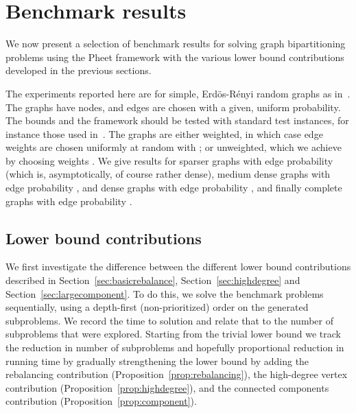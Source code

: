 \documentclass[a4paper,11pt]{article}
\begin{document}
\section{Benchmark results}

We now present a selection of benchmark results for solving graph
bipartitioning problems using the Pheet framework with the various
lower bound contributions developed in the previous sections.

The experiments reported here are for simple, Erd\"os-R\'enyi random
graphs as in~\cite{Wimmer14:diss}. The graphs have  nodes, and
edges are chosen with a given, uniform probability. The bounds and the
framework should be tested with standard test instances, for instance
those used
in~\cite{DellingGoldbergRazenshteynWerneck11,DellingGoldbergRazenshteynWerneck12,DellingWerneck12}. The
graphs are either weighted, in which case edge weights are chosen
uniformly at random with ; or unweighted, which we
achieve by choosing weights . We give results for sparser
graphs with edge probability  (which is, asymptotically, of
course rather dense), medium dense graphs with edge probability ,
and dense graphs with edge probability , and finally complete
graphs with edge probability .

\subsection{Lower bound contributions}

We first investigate the difference between the different lower bound
contributions described in Section~\ref{sec:basicrebalance},
Section~\ref{sec:highdegree} and Section~\ref{sec:largecomponent}. To
do this, we solve the benchmark problems sequentially, using a
depth-first (non-prioritized) order on the generated subproblems. We
record the time to solution and relate that to the number of
subproblems that were explored.  Starting from the trivial lower bound
we track the reduction in number of subproblems and hopefully
proportional reduction in running time by gradually strengthening the
lower bound by adding the rebalancing contribution
(Proposition~\ref{prop:rebalancing}), the high-degree vertex
contribution (Proposition~\ref{prop:highdegree}), and the connected
components contribution (Proposition~\ref{prop:component}).
\end{document}
